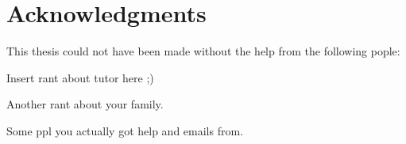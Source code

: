 \chapter{Acknowledgments}

This thesis could not have been made without the help from the following pople:

\noindent
Insert rant about tutor here ;)

\noindent
Another rant about your family.

\noindent
Some ppl you actually got help and emails from.

